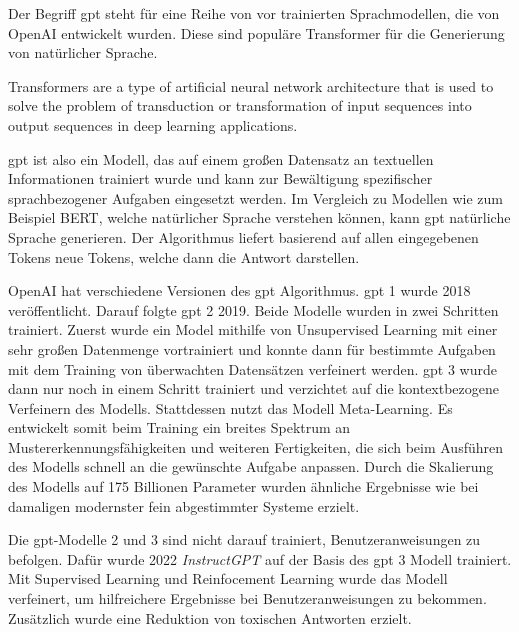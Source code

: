 Der Begriff \ac{gpt} steht für eine Reihe von vor trainierten Sprachmodellen, die von OpenAI entwickelt wurden. Diese sind populäre Transformer für die Generierung von natürlicher Sprache. \citep[vgl.][]{zhu_luo_2022}
\begin{definition}[Transformer]
	\label{def:transformer}
	\glqq Transformers are a type of artificial neural network architecture that is used to solve the problem of transduction or transformation of input sequences into output sequences in deep learning applications. \grqq{} \citep{Rogel-Salazar2022-pd}
\end{definition}
\ac{gpt} ist also ein Modell, das auf einem großen Datensatz an textuellen Informationen trainiert wurde und kann zur Bewältigung spezifischer sprachbezogener Aufgaben eingesetzt werden. Im Vergleich zu Modellen wie zum Beispiel BERT, welche natürlicher Sprache verstehen können, kann \ac{gpt} natürliche Sprache generieren. Der Algorithmus liefert basierend auf allen eingegebenen Tokens neue Tokens, welche dann die Antwort darstellen. \citep[vgl.][]{zhu_luo_2022}

OpenAI hat verschiedene Versionen des \ac{gpt} Algorithmus. \ac{gpt} 1 wurde 2018 veröffentlicht. Darauf folgte \ac{gpt} 2 2019. Beide Modelle wurden in zwei Schritten trainiert. Zuerst wurde ein Model mithilfe von Unsupervised Learning mit einer sehr großen Datenmenge vortrainiert und konnte dann für bestimmte Aufgaben mit dem Training von überwachten Datensätzen verfeinert werden. \citep[vgl.][]{alec_2018} \ac{gpt} 3 wurde dann nur noch in einem Schritt trainiert und verzichtet auf die kontextbezogene Verfeinern des Modells. \citep[vgl.][]{zhu_luo_2022} Stattdessen nutzt das Modell \glqq Meta-Learning\grqq{}. Es entwickelt somit beim Training ein breites Spektrum an Mustererkennungsfähigkeiten und weiteren Fertigkeiten, die sich beim Ausführen des Modells schnell an die gewünschte Aufgabe anpassen. Durch die Skalierung des Modells auf 175 Billionen Parameter wurden ähnliche Ergebnisse wie bei damaligen modernster fein abgestimmter Systeme erzielt. \citep[vgl.][]{brown2020language} 

Die \ac{gpt}-Modelle 2 und 3 sind nicht darauf trainiert, Benutzeranweisungen zu befolgen. Dafür wurde 2022 \textit{InstructGPT} auf der Basis des \ac{gpt} 3 Modell trainiert. Mit Supervised Learning und Reinfocement Learning wurde das Modell verfeinert, um hilfreichere Ergebnisse bei Benutzeranweisungen zu bekommen. Zusätzlich wurde eine Reduktion von toxischen Antworten erzielt. \citep[vgl.][]{ouyang2022training}


